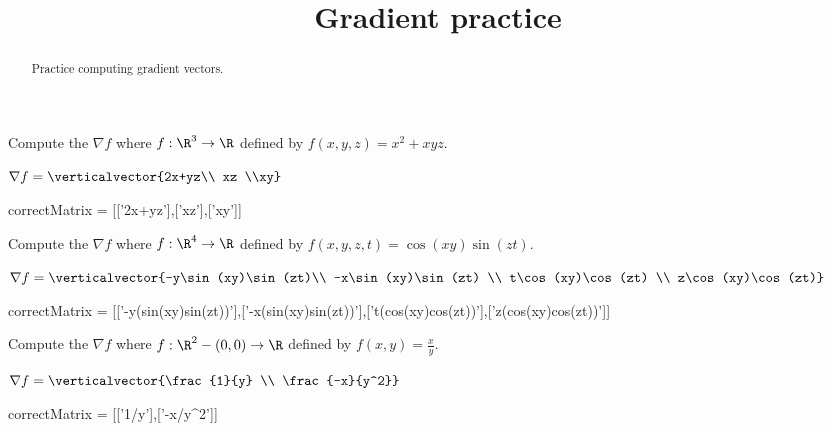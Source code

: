 \documentclass{ximera}
\title{Gradient practice}
\begin{document}
	\begin{abstract}
		Practice computing gradient vectors.
	\end{abstract}\maketitle
	
	\begin{question}	
		Compute the $\nabla f$ where $f:\R^3 \to \R$ defined by $f(x,y,z) = x^2+xyz$.
		\begin{solution}
		\begin{hint}
			\(\nabla f = \verticalvector{2x+yz\\ xz \\xy}\)
		\end{hint}
		\begin{matrix-answer}[name=J]
			correctMatrix  = [['2x+yz'],['xz'],['xy']]
		\end{matrix-answer}
		\end{solution}
	\end{question}
	
	\begin{question}	
		Compute the $\nabla f$ where $f:\R^4 \to \R$ defined by $f(x,y,z,t) = \cos(xy)\sin(zt)$.
		\begin{solution}
		\begin{hint}
			\(\nabla f = \verticalvector{-y\sin(xy)\sin(zt)\\ -x\sin(xy)\sin(zt) \\ t\cos(xy)\cos(zt) \\ z\cos(xy)\cos(zt)}\)
		\end{hint}
		\begin{matrix-answer}[name=J]
			correctMatrix  = [['-y(sin(xy)sin(zt))'],['-x(sin(xy)sin(zt))'],['t(cos(xy)cos(zt))'],['z(cos(xy)cos(zt))']]
		\end{matrix-answer}
		\end{solution}
	\end{question}
	
	\begin{question}	
		Compute the $\nabla f$ where $f:\R^2-{(0,0)} \to \R$ defined by $f(x,y) = \frac{x}{y}$.
		\begin{solution}
		\begin{hint}
			\(\nabla f = \verticalvector{\frac{1}{y} \\ \frac{-x}{y^2}}\)
		\end{hint}
		\begin{matrix-answer}[name=J]
			correctMatrix  = [['1/y'],['-x/y^2']]
		\end{matrix-answer}
		\end{solution}
	\end{question}

	
\end{document}
